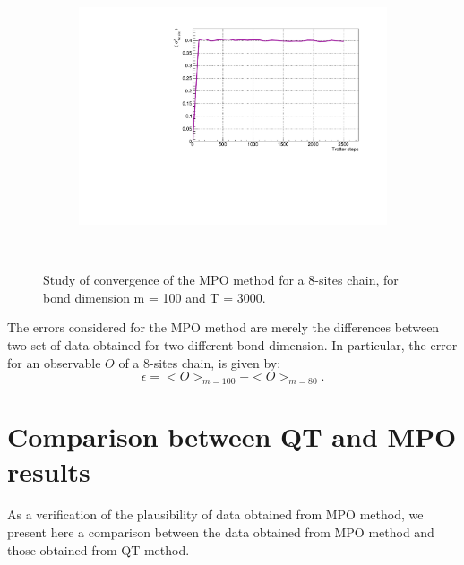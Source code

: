 \begin{figure}[H]
\begin{subfigure}{\columnwidth}
\centering
    \includegraphics[scale=0.6]{Figures/convergence/ConvergenceLM_L016_m080_Time002500_J1051.pdf}
    \label{fig:16sites_LMvsGamma}
\end{subfigure}\\
\captionsetup{width=1.\linewidth}
\caption{Study of convergence of the MPO method for a 8-sites chain, for bond dimension m = 100 and T = 3000.}
\label{fig:convergence_8_12_16}
\end{figure}

The errors considered for the MPO method are merely the differences between two set of data obtained for two different bond dimension. In particular, the error for an observable $O$ of a 8-sites chain, is given by:
\begin{equation*}
    \epsilon = <O>_{m=100} - <O>_{m=80}.
\end{equation*}

\section{Comparison between QT and MPO results}
As a verification of the plausibility of data obtained from MPO method, we present here a comparison between the data obtained from MPO method and those obtained from QT method.

